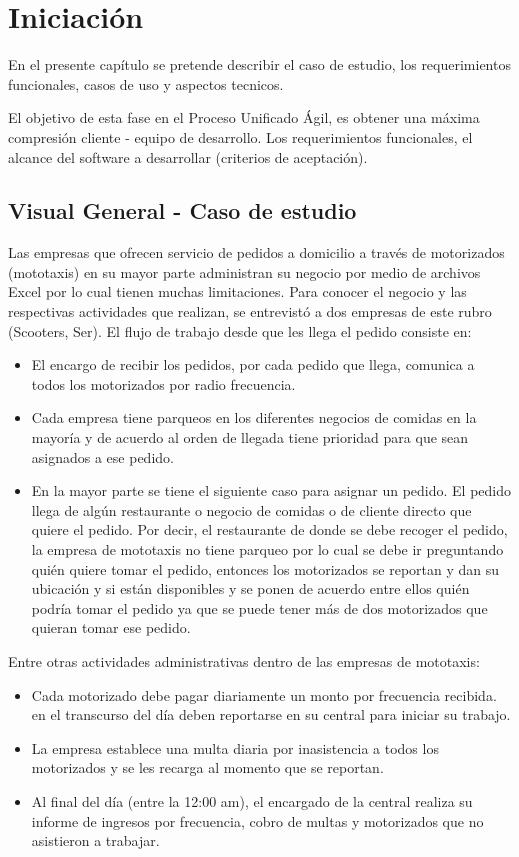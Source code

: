\chapter{Iniciación}
\noindent En el presente capítulo se pretende describir el caso de estudio, los requerimientos funcionales, casos de uso y aspectos tecnicos.

\noindent El objetivo de esta fase en el Proceso Unificado Ágil, es obtener una máxima compresión cliente - equipo de desarrollo. Los requerimientos funcionales, el alcance del software a desarrollar (criterios de aceptación).

\section {Visual General - Caso de estudio}
\noindent Las empresas que ofrecen servicio de pedidos a domicilio a través de motorizados (mototaxis) en su mayor parte administran su negocio por medio de archivos Excel por lo cual tienen muchas limitaciones.
Para conocer el negocio y las respectivas actividades que realizan, se entrevistó a dos empresas de este rubro (Scooters, Ser). El flujo de trabajo desde que les llega el pedido consiste en:
\begin{itemize}
\item El encargo de recibir los pedidos, por cada pedido que llega, comunica a todos los motorizados por radio frecuencia.
\item Cada empresa tiene parqueos en los diferentes negocios de comidas en la mayoría y de acuerdo al orden de llegada tiene prioridad para que sean asignados a ese pedido.
\item En la mayor parte se tiene el siguiente caso para asignar un pedido. El pedido llega de algún restaurante o negocio de comidas o de cliente directo que quiere el pedido. Por decir, el restaurante de donde se debe recoger el pedido, la empresa de mototaxis no tiene parqueo por lo cual se debe ir preguntando quién quiere tomar el pedido, entonces los motorizados se reportan y dan su ubicación y si están disponibles y se ponen de acuerdo entre ellos quién podría tomar el pedido ya que se puede tener más de dos motorizados que quieran tomar ese pedido.
\end{itemize}
\indent Entre otras actividades administrativas dentro de las empresas de mototaxis:
\begin{itemize}
\item Cada motorizado debe pagar diariamente un monto por frecuencia recibida. en el transcurso del día deben reportarse en su central para iniciar su trabajo.
\item La empresa establece una multa diaria por inasistencia a todos los motorizados y se les recarga al momento que se reportan.
\item Al final del día (entre la 12:00 am), el encargado de la central realiza su informe de ingresos por frecuencia, cobro de multas y motorizados que no asistieron a trabajar.
\end{itemize}
